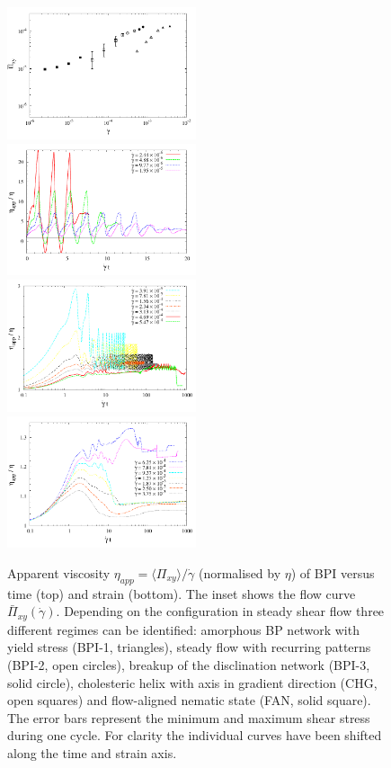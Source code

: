 \documentclass[8.5pt,twoside,twocolumn]{article}
\newcommand{\gd}{\dot{\gamma}}
\begin{document}
\begin{figure}[htpb]
\includegraphics[width=0.495\textwidth]{flowcurve_bp1.pdf}\\
\includegraphics[width=0.495\textwidth]{app_visc_strain_bp1_a.pdf}\\
\includegraphics[width=0.495\textwidth]{app_visc_strain_bp1_b.pdf}\\
\includegraphics[width=0.495\textwidth]{app_visc_strain_bp1_c.pdf}
\caption{Apparent viscosity $\eta_{app}=\langle \Pi_{xy}\rangle/\dot{\gamma}$ (normalised by $\eta$) of BPI versus time (top) 
and strain (bottom). The inset shows the flow curve $\bar{\Pi}_{xy}(\gd)$. 
Depending on the configuration in steady shear flow three different regimes 
can be identified: amorphous BP network with yield stress (BPI-1, triangles), 
steady flow with recurring patterns (BPI-2, open circles), 
breakup of the disclination network (BPI-3, solid circle), 
cholesteric helix with axis in gradient direction (CHG, open squares) 
and flow-aligned nematic state (FAN, solid square). 
The error bars represent the minimum and maximum shear stress 
during one cycle. For clarity the individual curves have been shifted along
the time and strain axis.}
\label{bp1-rheo}
\end{figure}
\end{document}

